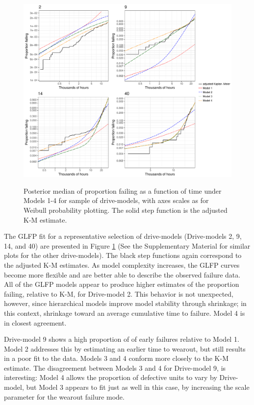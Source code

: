 \documentclass[12pt]{article}
\begin{document}
\begin{figure}[H]
{\centering
\includegraphics[width=\textwidth]{single-drive-4-Models-ex}}
\caption{Posterior median of proportion failing as a function of time under Models 1-4 for sample of drive-models, with axes scales as for Weibull probability plotting.  The solid step function is the adjusted K-M estimate.}
\label{fig:mod_comp_leg}
\end{figure}

The GLFP fit for a representative selection of drive-models (Drive-models 2, 9, 14, and 40) are presented in Figure \ref{fig:mod_comp_leg} (See the Supplementary Material for similar plots for the other drive-models).  The black step functions again correspond to the adjusted K-M estimates.  As model complexity increases, the GLFP curves become more flexible and are better able to describe the observed failure data.  All of the GLFP models appear to produce higher estimates of the proportion failing, relative to K-M, for Drive-model 2. This behavior is not unexpected, however, since hierarchical models improve model stability through shrinkage; in this context, shrinkage toward an average cumulative time to failure. Model 4 is in closest agreement. 

Drive-model 9 shows a high proportion of  of early failures relative to Model 1. Model 2 addresses this by estimating an earlier time to wearout, but still results in a poor fit to the data. Models 3 and 4 conform more closely to the K-M estimate. The disagreement between Models 3 and 4 for Drive-model 9, is interesting: Model 4 allows the proportion of defective units to vary by Drive-model, but Model 3 appears to fit just as well in this case, by increasing the scale parameter for the wearout failure mode.
\end{document}

